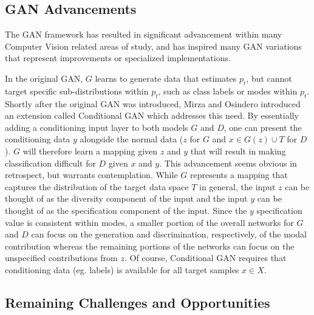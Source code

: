 \documentclass[11pt]{article}
\begin{document}
\subsection{GAN Advancements}
The GAN framework has resulted in significant advancement within many Computer Vision related areas of study, and has inspired many GAN variations that represent improvements or specialized implementations.

In the original GAN, $G$ learns to generate data that estimates $p_t$, but cannot target specific sub-distributions within $p_t$, such as class labels or modes within $p_t$.  Shortly after the original GAN was introduced, Mirza and Osindero introduced an extension called Conditional GAN \cite{mirza2014conditional} which addresses this need.  By essentially adding a conditioning input layer to both models $G$ and $D$, one can present the conditioning data $y$ alongside the normal data ($z$ for $G$ and $x \in G(z) \cup T$ for $D$).  $G$ will therefore learn a mapping given $z$ and $y$ that will result in making classification difficult for $D$ given $x$ and $y$.  This advancement seems obvious in retrospect, but warrants contemplation.  While $G$ represents a mapping that captures the distribution of the target data space $T$ in general, the input $z$ can be thought of as the diversity component of the input and the input $y$ can be thought of as the specification component of the input.  Since the $y$ specification value is consistent within modes, a smaller portion of the overall networks for $G$ and $D$ can focus on the generation and discrimination, respectively, of the modal contribution whereas the remaining portions of the networks can focus on the unspecified contributions from $z$.  Of course, Conditional GAN requires that conditioning data (eg. labels) is available for all target samples $x \in X$.


\subsection{Remaining Challenges and Opportunities}
\end{document}

